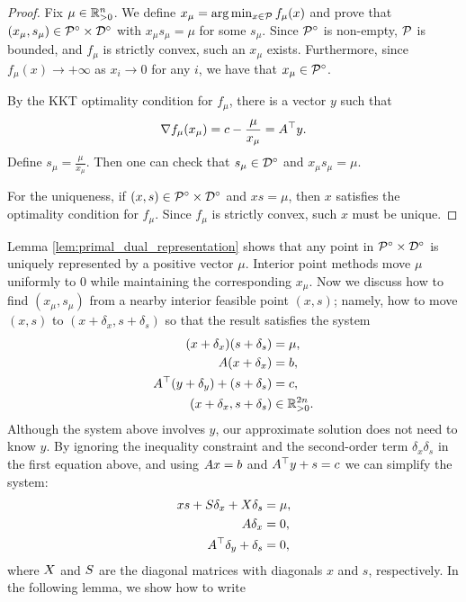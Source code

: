 \begin{proof}
Fix $\mu\in\mathbb{R}^{n}_{>0}$. We define $x_{\mu}=\arg\min_{x\in\mathcal{P}}f_{\mu}(x)$
and prove that $(x_{\mu},s_{\mu})\in\mathcal{P}^{\circ}\times\mathcal{D}^{\circ}$
with $x_{\mu}s_{\mu}=\mu$ for some $s_{\mu}$. Since $\mathcal{P}^{\circ}$
is non-empty, $\mathcal{P}$ is bounded, and $f_{\mu}$ is strictly convex,
such an $x_{\mu}$ exists. Furthermore, since $f_{\mu}(x)\rightarrow+\infty$
as $x_{i}\rightarrow0$ for any $i$, we have that $x_{\mu}\in\mathcal{P}^{\circ}$.

By the KKT optimality condition for $f_{\mu}$, there is a vector
$y$ such that
\[
\nabla f_{\mu}(x_{\mu})=c-\frac{\mu}{x_{\mu}}=A^{\top}y.
\]
Define $s_{\mu}=\frac{\mu}{x_{\mu}}$. Then one can check that $s_{\mu}\in\mathcal{D}^{\circ}$
and $x_{\mu}s_{\mu}=\mu$.

For the uniqueness, if $(x,s)\in\mathcal{P}^{\circ}\times\mathcal{D}^{\circ}$
and $xs=\mu$, then $x$ satisfies the optimality condition for $f_{\mu}$.
Since $f_{\mu}$ is strictly convex, such $x$ must be unique.
\end{proof}
Lemma \ref{lem:primal_dual_representation} shows that any point in
$\mathcal{P}^{\circ}\times\mathcal{D}^{\circ}$ is uniquely represented by a
positive vector $\mu$. Interior point methods move $\mu$ uniformly
to $0$ while maintaining the corresponding $x_{\mu}$. Now we discuss
how to find $(x_{\mu},s_{\mu})$ from a nearby interior feasible point
$(x,s)$; namely, how to move $(x,s)$ to $(x+\delta_{x},s+\delta_{s})$
so that the result satisfies the system
\begin{align*}
(x+\delta_{x})(s+\delta_{s}) & =\mu,\\
A(x+\delta_{x}) & =b,\\
A^{\top}(y+\delta_{y})+(s+\delta_{s}) & =c,\\
(x+\delta_{x},s+\delta_{s}) & \in\mathbb{R}^{2n}_{>0}.
\end{align*}
Although the system above involves $y$, our approximate solution
does not need to know $y$. By ignoring the inequality constraint
and the second-order term $\delta_{x}\delta_{s}$ in the first equation
above, and using $A x=b$ and $A^{\top}y+s=c$ we can simplify
the system:
\begin{align}
xs+S\delta_{x}+X\delta_{s} & =\mu,\label{eq:LP_newton_step}\\
A\delta_{x} & =0,\nonumber \\
A^{\top}\delta_{y}+\delta_{s} & =0,\nonumber 
\end{align}
where $X$ and $S$ are the diagonal matrices with diagonals $x$
and $s$, respectively. In the following lemma, we show how to write
